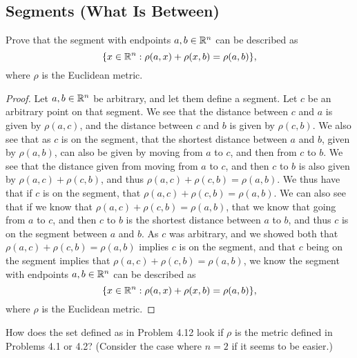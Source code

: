 \subsection{Segments (What Is Between)}

\begin{minorEx}%
    Prove that the segment with endpoints $a,b \in \mathbb{R}^n$ can be described as 
    \[
        \{x \in \mathbb{R}^n : \rho(a,x) + \rho(x,b) = \rho(a, b)\},
    \]
    where $\rho$ is the Euclidean metric.
\end{minorEx}

\begin{proof}
  Let $a,b \in \mathbb{R}^n$ be arbitrary, and let them define a segment. Let
  $c$ be an arbitrary point on that segment. We see that the distance
  between $c$ and $a$ is given by $\rho(a,c)$, and the distance
  between $c$ and $b$ is given by $\rho(c,b)$. We also see that as $c$
  is on the segment, that the shortest distance between $a$ and $b$,
  given by $\rho(a,b)$, can also be given by moving from $a$ to $c$,
  and then from $c$ to $b$. We see that the distance given from moving
  from $a$ to $c$, and then $c$ to $b$ is also given by
  $\rho(a,c)+\rho(c,b)$, and thus $\rho(a,c)+\rho(c,b)= \rho(a,b)$. We
  thus have that if $c$ is on the segment, that $\rho(a,c)+\rho(c,b)=
  \rho(a,b)$. We can also see that if we know that $\rho(a,c)+\rho(c,b)=
  \rho(a,b)$, that we know that going from $a$ to $c$, and then $c$ to
  $b$ is the shortest distance between $a$ to $b$, and thus $c$ is on
  the segment between $a$ and $b$. As $c$ was arbitrary, and we showed
  both that $\rho(a,c)+\rho(c,b)= \rho(a,b)$ implies $c$ is on the
  segment, and that $c$ being on the segment implies that
  $\rho(a,c)+\rho(c,b)= \rho(a,b)$, we know the 
  segment with endpoints $a,b \in \mathbb{R}^n$ can be described as 
    \[
        \{x \in \mathbb{R}^n : \rho(a,x) + \rho(x,b) = \rho(a, b)\},
    \]
    where $\rho$ is the Euclidean metric.
\end{proof}

\begin{minorEx}%
    How does the set defined as in Problem 4.12 look if $\rho$ is the metric
    defined in Problems 4.1 or 4.2? (Consider the case where $n = 2$ if it seems
    to be easier.)
\end{minorEx}


